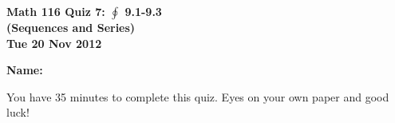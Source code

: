 \documentclass[11pt,letterpaper]{article}
\begin{document}
\flushleft
\begin{multicols}{2}

\begin{large}\textbf{Math 116 Quiz 7: $\oint$ 9.1-9.3 \\ (Sequences and Series) \\
Tue 20 Nov 2012}\end{large}

\textbf{Name:  }\underline{\hspace{35ex}}

\vspace{.5in}

\end{multicols}

\pagestyle{empty}

\flushleft

You have 35 minutes to complete this quiz.  Eyes on your own paper and good luck!
\end{document}
